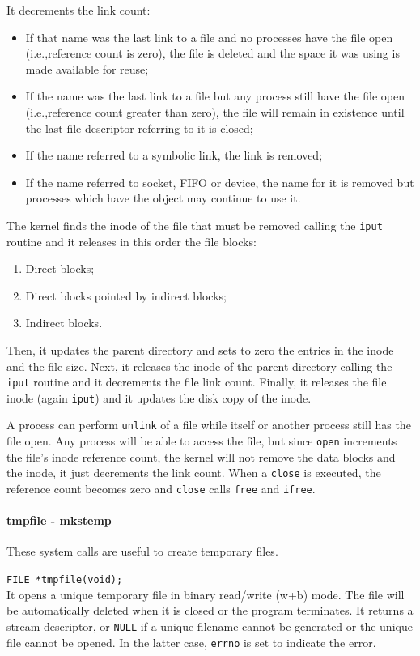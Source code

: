 It decrements the link count:
\begin{itemize}
\item If that name was the last link to a file and no processes have the file open (i.e.,\@ reference count is zero), the file is deleted and the space it was using is made available for reuse;
\item If the name was the last link to a file but any process still have the file open (i.e.,\@ reference count greater than zero), the file will remain in existence until the last file descriptor referring to it is closed;
\item If the name referred to a symbolic link, the link is removed;
\item If the name referred to socket, FIFO or device, the name for it is removed but processes which have the object may continue to use it.
\end{itemize}
The kernel finds the inode of the file that must be removed calling the \texttt{iput} routine and it releases in this order the file blocks:
\begin{enumerate}
\item Direct blocks;
\item Direct blocks pointed by indirect blocks;
\item Indirect blocks.
\end{enumerate}
Then, it updates the parent directory and sets to zero the entries in the inode and the file size. Next, it releases the inode of the parent directory calling the \texttt{iput} routine and it decrements
the file link count. Finally, it releases the file inode (again \texttt{iput}) and it updates the disk copy of the inode.

A process can perform \texttt{unlink} of a file while itself or another process still has the file open. Any process will be able to access the file, but since \texttt{open} increments the file's inode reference count, the kernel will not remove the data blocks and the inode, it just decrements the link count. When a \texttt{close} is executed, the reference count becomes zero and \texttt{close} calls \texttt{free} and \texttt{ifree}.

\paragraph{tmpfile - mkstemp}
These system calls are useful to create temporary files.

\texttt{FILE *tmpfile(void);}
\\
It opens a unique temporary file in binary read/write (w+b) mode. The file will be automatically deleted when it is closed or the program terminates. It returns a stream descriptor, or \texttt{NULL} if a  unique filename cannot be generated or the unique file cannot be opened. In the latter case, \texttt{errno} is set to indicate the error.

